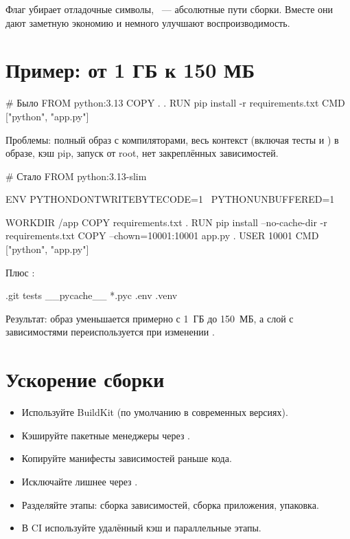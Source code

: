 Флаг  убирает отладочные символы,
~--- абсолютные пути сборки. Вместе они дают
заметную экономию и немного улучшают воспроизводимость.

\section{Пример: от 1 ГБ к 150 МБ}

\begin{code}[language=dockerfile]
# Было
FROM python:3.13
COPY . .
RUN pip install -r requirements.txt
CMD ["python", "app.py"]
\end{code}

Проблемы: полный образ с компиляторами, весь контекст (включая тесты
и ) в образе, кэш pip, запуск от root, нет закреплённых
зависимостей.

\begin{code}[language=dockerfile]
# Стало
FROM python:3.13-slim

ENV PYTHONDONTWRITEBYTECODE=1 \
    PYTHONUNBUFFERED=1

WORKDIR /app
COPY requirements.txt .
RUN pip install --no-cache-dir -r requirements.txt
COPY --chown=10001:10001 app.py .
USER 10001
CMD ["python", "app.py"]
\end{code}

Плюс :

\begin{code}
.git
tests
__pycache__
*.pyc
.env
.venv
\end{code}

Результат: образ уменьшается примерно с 1~ГБ до 150~МБ, а слой
с зависимостями переиспользуется при изменении .


\section{Ускорение сборки}

\begin{itemize}
  \item Используйте BuildKit (по умолчанию в современных версиях).
  \item Кэшируйте пакетные менеджеры через
        .
  \item Копируйте манифесты зависимостей раньше кода.
  \item Исключайте лишнее через .
  \item Разделяйте этапы: сборка зависимостей, сборка приложения,
        упаковка.
  \item В CI используйте удалённый кэш и параллельные этапы.
\end{itemize}

